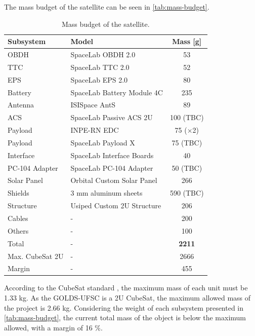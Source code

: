 The mass budget of the satellite can be seen in \autoref{tab:mass-budget}.

\begin{table}[!h]
    \centering
    \begin{tabular}{llc}
        \toprule[1.5pt]
        \textbf{Subsystem} & \textbf{Model} & \textbf{Mass [g]} \\
        \midrule
        OBDH            & SpaceLab OBDH 2.0             & 53 \\
        TTC             & SpaceLab TTC 2.0              & 52 \\
        EPS             & SpaceLab EPS 2.0              & 80 \\
        Battery         & SpaceLab Battery Module 4C    & 235 \\
        Antenna         & ISISpace AntS                 & 89 \\
        ACS             & SpaceLab Passive ACS 2U       & 100 (TBC) \\
        Payload         & INPE-RN EDC                   & 75 ($\times$2) \\
        Payload         & SpaceLab Payload X            & 75 (TBC) \\
        Interface       & SpaceLab Interface Boards     & 40 \\
        PC-104 Adapter  & SpaceLab PC-104 Adapter       & 50 (TBC) \\
        Solar Panel     & Orbital Custom Solar Panel    & 266 \\
        Shields         & 3 mm aluminum sheets          & 590 (TBC) \\
        Structure       & Usiped Custom 2U Structure    & 206 \\
        Cables          & -                             & 200 \\
        Others          & -                             & 100 \\
        \midrule
        Total           & -                             & \textbf{2211} \\
        Max. CubeSat 2U & -                             & 2666 \\
        Margin          & -                             & 455 \\
        \bottomrule[1.5pt]
    \end{tabular}
    \caption{Mass budget of the satellite.}
    \label{tab:mass-budget}
\end{table}

According to the CubeSat standard \cite{cds}, the maximum mass of each unit must be 1.33 kg. As the GOLDS-UFSC is a 2U CubeSat, the maximum allowed mass of the project is 2.66 kg. Considering the weight of each subsystem presented in \autoref{tab:mass-budget}, the current total mass of the object is below the maximum allowed, with a margin of 16 \%.

